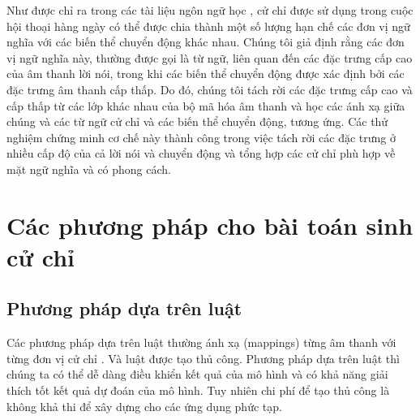 
Như được chỉ ra trong các tài liệu ngôn ngữ học \cite{kipp2005gesture} \cite{neff2008gesture} \cite{webb1997linguistic},
cử chỉ được sử dụng trong cuộc hội thoại hàng ngày có thể được chia thành một số lượng hạn chế các đơn vị ngữ nghĩa với các biến thể chuyển động khác nhau. Chúng tôi giả định rằng các đơn vị ngữ nghĩa này, thường được gọi là từ ngữ, liên quan đến các đặc trưng cấp cao của âm thanh lời nói, trong khi các biến thể chuyển động được xác định bởi các đặc trưng âm thanh cấp thấp. Do đó, chúng tôi tách rời các đặc trưng cấp cao và cấp thấp từ các lớp khác nhau của bộ mã hóa âm thanh và học các ánh xạ giữa chúng và các từ ngữ cử chỉ và các biến thể chuyển động, tương ứng. Các thử nghiệm chứng minh cơ chế này thành công trong việc tách rời các đặc trưng ở nhiều cấp độ của cả lời nói và chuyển động và tổng hợp các cử chỉ phù hợp về mặt ngữ nghĩa và có phong cách.

\section{Các phương pháp cho bài toán sinh cử chỉ}

\subsection{Phương pháp dựa trên luật}

Các phương pháp dựa trên luật thường ánh xạ (mappings) từng âm thanh với từng đơn vị cử chỉ \cite{huang2012robot}. Và luật được tạo thủ công. Phương pháp dựa trên luật thì chúng ta có thể dễ dàng điều khiển kết quả của mô hình và có khả năng giải thích tốt kết quả dự đoán của mô hình.
Tuy nhiên chi phí để tạo thủ công là không khả thi để xây dựng cho các ứng dụng phức tạp.

